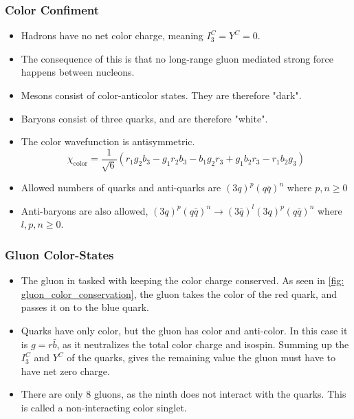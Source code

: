 \subsubsection{Color Confiment}
\begin{itemize}
    \item Hadrons have no net color charge, meaning $I_3^{C} = Y^{C} = 0$. 
    \item The consequence of this is that no long-range gluon mediated strong force happens between nucleons. 
    \item Mesons consist of color-anticolor states. They are therefore "dark". 
    \item Baryons consist of three quarks, and are therefore "white".
    \item The color wavefunction is antisymmetric. 
    \begin{equation}
      χ_{\text{color}} = \frac{1}{\sqrt{6}} \left(r_1g_2b_3 - g_1r_2b_3 - b_1g_2r_3 + g_1b_2r_3 - r_1b_2g_3\right)
    \end{equation}
    \item Allowed numbers of quarks and anti-quarks are $(3q)^{p}(q \bar{q})^{n}$ where $p,n ≥ 0$
    \item Anti-baryons are also allowed, $(3q)^{p}(q \bar{q})^{n} → (3\bar{q})^{l}(3q)^{p}(q \bar{q})^{n}$ where $l,p,n ≥ 0$. 
\end{itemize}



\subsubsection{Gluon Color-States}
\begin{itemize}
    \item The gluon in tasked with keeping the color charge conserved. As seen in \cref{fig: gluon_color_conservation}, the gluon takes the color of the red quark, and passes it on to the blue quark. 
    \item Quarks have only color, but the gluon has color and anti-color. In this case it is $g = r \bar{b}$, as it neutralizes the total color charge and isospin. Summing up the $I_3^{C}$ and $Y^{C}$ of the quarks, gives the remaining value the gluon must have to have net zero charge.
    \item There are only 8 gluons, as the ninth does not interact with the quarks. This is called a non-interacting color singlet. 
\end{itemize}

